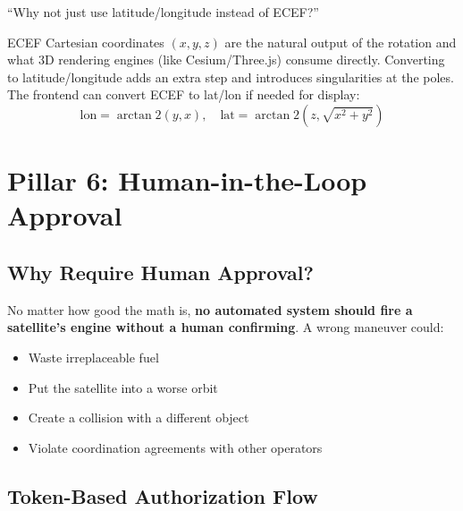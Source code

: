 \documentclass[12pt,a4paper]{article}
\begin{document}
\begin{questionbox}
``Why not just use latitude/longitude instead of ECEF?''
\end{questionbox}
\begin{answerbox}
ECEF Cartesian coordinates $(x, y, z)$ are the natural output of the rotation and what 3D rendering engines (like Cesium/Three.js) consume directly. Converting to latitude/longitude adds an extra step and introduces singularities at the poles. The frontend can convert ECEF to lat/lon if needed for display:
\[
\text{lon} = \arctan2(y, x), \quad \text{lat} = \arctan2\left(z, \sqrt{x^2 + y^2}\right)
\]
\end{answerbox}

\newpage
\section{Pillar 6: Human-in-the-Loop Approval}

\subsection{Why Require Human Approval?}
No matter how good the math is, \textbf{no automated system should fire a satellite's engine without a human confirming}. A wrong maneuver could:
\begin{itemize}
    \item Waste irreplaceable fuel
    \item Put the satellite into a worse orbit
    \item Create a collision with a different object
    \item Violate coordination agreements with other operators
\end{itemize}

\subsection{Token-Based Authorization Flow}
\end{document}

